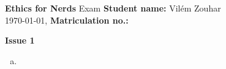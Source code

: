 \documentclass[a4paper, 11pt]{article}
\newcommand{\stdn}{} \newcommand{\studentname}[1]{\renewcommand{\stdn}{#1}}
\newcommand{\mtrk}{} \newcommand{\matriculationno}[1]{\renewcommand{\mtrk}{#1}}
\newcommand{\isnr}{} \newcommand{\issuenumber}[1]{\renewcommand{\isnr}{#1}}
\newcommand{\makeheader}{\textbf{Ethics for Nerds} Exam \hfill \textbf{Student name:} \stdn \\ \today, \currenttime \hfill \textbf{Matriculation no.:} \mtrk \par \textbf{\Large Issue \isnr}}
\begin{document}
\sffamily


\studentname{Vilém Zouhar} %
\matriculationno{} %
\issuenumber{1} %
\makeheader %


\begin{enumerate}[a)]
    \item
\end{enumerate}

\end{document}
